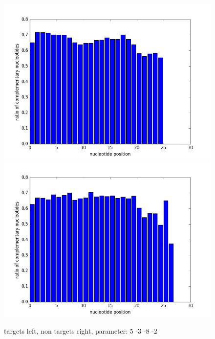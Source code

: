\documentclass[12pt]{article}
\begin{document}
\begin{figure}
\includegraphics[scale=0.2]{results/ratio5-3-8-2.png}
\includegraphics[scale=0.2]{results/non-ratio5-3-8-2.png}
\caption {targets left, non targets right, parameter: 5 -3 -8 -2}
\label{fig:plot8}
\end{figure}
\end{document}
